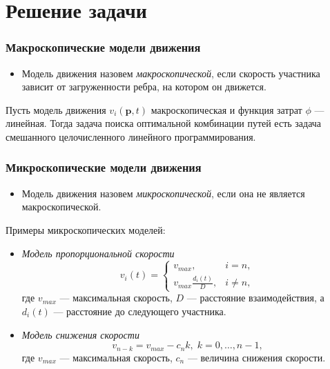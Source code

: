 \documentclass{beamer}
\begin{document}
\section{Решение задачи}

\begin{frame}\frametitle{Макроскопические модели движения}
	\begin{itemize}
	\item Модель движения назовем \textit{макроскопической}, если скорость участника зависит от загруженности ребра, на котором он движется.
	\end{itemize}

	\begin{theorem}
	Пусть модель движения $ v_i(\textbf{p}, t)$ макроскопическая и функция затрат $\phi$ --- линейная. Тогда задача поиска оптимальной комбинации путей есть задача смешанного целочисленного линейного программирования.
	\end{theorem}
\end{frame}

\begin{frame}\frametitle{Микроскопические модели движения}
	\begin{itemize}
		\item Модель движения назовем \textit{микроскопической}, если она не является макроскопической.
	\end{itemize}
	
	\bigskip
	Примеры микроскопических моделей:
	\begin{itemize}
		\item \textit{Модель пропорциональной скорости}
		\begin{equation}
			\label{eq:micro}
			v_i(t)=
			\begin{cases}
				v_{max}, & i = n,
				\\
				v_{max} \frac{d_i(t)}{D} ,& i \ne n,
			\end{cases}
		\end{equation}
	где $v_{max}$ --- максимальная скорость, $D$ --- расстояние взаимодействия, а $d_i(t)$ --- расстояние до следующего участника.
	
	\item \textit{Модель снижения скорости}
	\begin{equation}
		v_{n - k} = v_{max} - c_n k, \; k = 0, \dots, n - 1,
	\end{equation}
	где $v_{max}$ --- максимальная скорость, $c_n$ --- величина снижения скорости.
	
	\end{itemize}
\end{frame}
\end{document}
